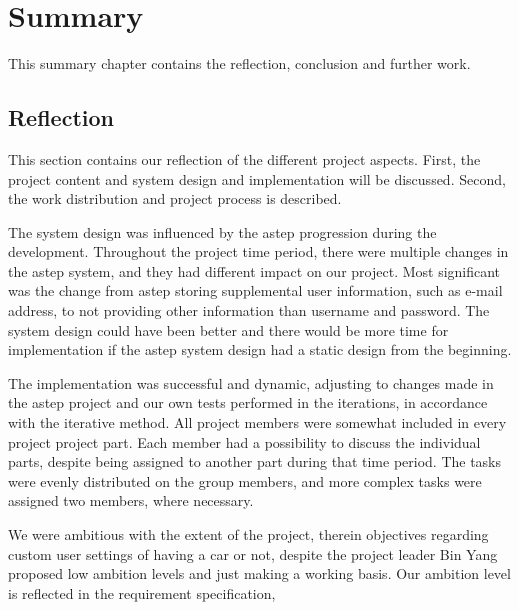 \chapter{Summary}
This summary chapter contains the reflection, conclusion and further work.

\section{Reflection}
This section contains our reflection of the different project aspects.
First, the project content and system design and implementation will be discussed.
Second, the work distribution and project process is described.

The system design was influenced by the \gls{astep} progression during the development.
Throughout the project time period, there were multiple changes in the \gls{astep} system, and they had different impact on our project.
Most significant was the change from \gls{astep} storing supplemental user information, such as e-mail address, to not providing other information than username and password.
The system design could have been better and there would be more time for implementation if the \gls{astep} system design had a static design from the beginning.

The implementation was successful and dynamic, adjusting to changes made in the \gls{astep} project and our own tests performed in the iterations, in accordance with the iterative method.
All project members were somewhat included in every project project part.
Each member had a possibility to discuss the individual parts, despite being assigned to another part during that time period.
The tasks were evenly distributed on the group members, and more complex tasks were assigned two members, where necessary.

We were ambitious with the extent of the project, therein objectives regarding custom user settings of having a car or not, despite the project leader Bin Yang proposed low ambition levels and just making a working basis.
Our ambition level is reflected in the requirement specification, 

